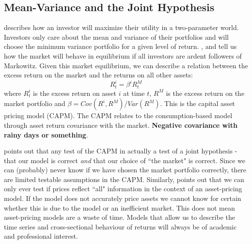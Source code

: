 
\subsection{Mean-Variance and the Joint Hypothesis}

\textcite{markowitz1952portfolio} describes how an investor will maximize their utility in a 
two-parameter world.
Investors only care about the mean and variance of their portfolios and will choose the 
minimum variance portfolio for a given level of return.
\textcite{sharpe1964capital}, \textcite{lintner1965valuation} and \textcite{black1972capital} 
tell us how the market will behave in equilibrium if all investors are ardent followers of 
Markowitz.
Given this market equilibrium, we can describe a relation between the excess return on the 
market and the returns on all other assets:
\[
  R_t^i = \beta^iR_t^M
\]
where $R_t^i$ is the excess return on asset $i$ at time $t$, $R^M$ is the excess return on the 
market portfolio and $\beta=Cov(R^i, R^M)/Var(R^M)$.
This is the capital asset pricing model (CAPM).
The CAPM relates to the consumption-based model through asset return covariance with the 
market.
\textbf{Negative covariance with rainy days or something}.

\textcite{roll1977critique} points out that any test of the CAPM in actually a test of a joint 
hypothesis - that our model is correct \emph{and} that our choice of ``the market" is correct.
Since we can (probably) never know if we have chosen the market portfolio correctly, there are 
limited testable assumptions in the CAPM.
Similarly, \textcite{fama1991efficient} points out that we can only ever test if prices 
reflect ``all" information in the context of an asset-pricing model.
If the model does not accurately price assets we cannot know for certain whether this is due 
to the model or an inefficient market.
This does not mean asset-pricing models are a waste of time.
Models that allow us to describe the time series and cross-sectional behaviour of returns will 
always be of academic and professional interest.

